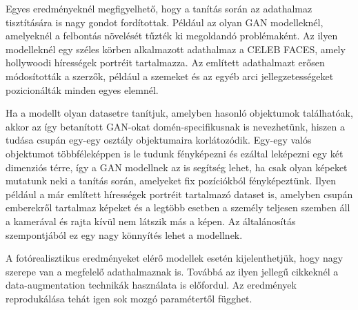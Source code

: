 
Egyes eredményeknél megfigyelhető, hogy a tanítás során az adathalmaz tisztítására is nagy gondot fordítottak. Például az olyan GAN modelleknél, amelyeknél a felbontás növelését tűzték ki megoldandó problémaként. Az ilyen modelleknél egy széles körben alkalmazott adathalmaz a CELEB FACES, amely hollywoodi hírességek portréit tartalmazza. Az említett adathalmazt erősen módosították a szerzők, például a szemeket és az egyéb arci jellegzetességeket pozicionálták minden egyes elemnél.

Ha a modellt olyan datasetre tanítjuk, amelyben hasonló objektumok találhatóak, akkor az így betanított GAN-okat domén-specifikusnak is nevezhetünk, hiszen a tudása csupán egy-egy osztály objektumaira korlátozódik. Egy-egy valós objektumot többféleképpen is le tudunk fényképezni és ezáltal leképezni egy két dimenziós térre, így a GAN modellnek az is segítség lehet, ha csak olyan képeket mutatunk neki a tanítás során, amelyeket fix pozíciókból fényképeztünk.
Ilyen például a már említett hírességek portréit tartalmazó dataset is, amelyben csupán emberekről tartalmaz képeket és a legtöbb esetben a személy teljesen szemben áll a kamerával és rajta kívül nem látszik más a képen. Az általánosítás szempontjából ez egy nagy könnyítés lehet a modellnek.

A fotórealisztikus eredményeket elérő modellek esetén kijelenthetjük, hogy nagy szerepe van a megfelelő adathalmaznak is. Továbbá az ilyen jellegű cikkeknél a data-augmentation technikák használata is előfordul. Az eredmények reprodukálása tehát igen sok mozgó paramétertől függhet.